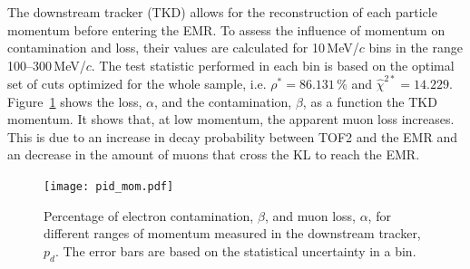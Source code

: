 The downstream tracker (TKD) allows for the reconstruction of each particle momentum before entering the EMR. To assess the influence of momentum on contamination and loss, their values are calculated for 10\,MeV/$c$ bins in the range 100--300\,MeV/$c$. The test statistic performed in each bin is based on the optimal set of cuts optimized for the whole sample, i.e. $\rho^*=86.131$\,\% and $\hat{\chi}^{2*}=14.229$. Figure~\ref{fig:emr_pid_mom} shows the loss, $\alpha$, and the contamination, $\beta$, as a function the TKD momentum. It shows that, at low momentum, the apparent muon loss increases. This is due to an increase in decay probability between TOF2 and the EMR and an decrease in the amount of muons that cross the KL to reach the EMR.

\begin{figure}[htb!]
	\begin{center}
		\texttt{[image: pid\_mom.pdf]}  		
		\caption{Percentage of electron contamination, $\beta$, and muon loss, $\alpha$, for different ranges of momentum measured in the downstream tracker, $p_d$. The error bars are based on the statistical uncertainty in a bin.}
		\label{fig:emr_pid_mom}
	\end{center}
\end{figure}
